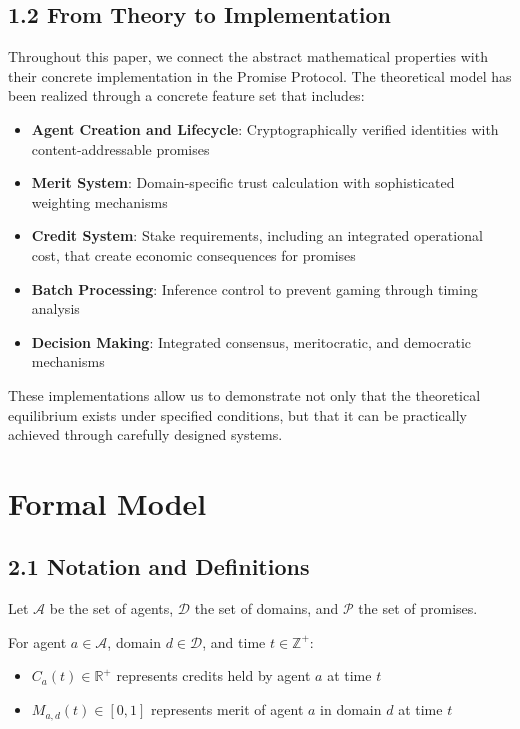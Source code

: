 \documentclass[11pt]{article}
\begin{document}
\subsection{1.2 From Theory to Implementation}
\label{sec:org7b752e5}
Throughout this paper, we connect the abstract mathematical properties with their concrete implementation in the Promise Protocol. The theoretical model has been realized through a concrete feature set that includes:

\begin{itemize}
\item \textbf{Agent Creation and Lifecycle}: Cryptographically verified identities with content-addressable promises
\item \textbf{Merit System}: Domain-specific trust calculation with sophisticated weighting mechanisms
\item \textbf{Credit System}: Stake requirements, including an integrated operational cost, that create economic consequences for promises
\item \textbf{Batch Processing}: Inference control to prevent gaming through timing analysis
\item \textbf{Decision Making}: Integrated consensus, meritocratic, and democratic mechanisms
\end{itemize}

These implementations allow us to demonstrate not only that the theoretical equilibrium exists under specified conditions, but that it can be practically achieved through carefully designed systems.
\section{Formal Model}
\label{sec:org2dfcb47}
\subsection{2.1 Notation and Definitions}
\label{sec:orgbdda3de}
Let \(\mathcal{A}\) be the set of agents, \(\mathcal{D}\) the set of domains, and \(\mathcal{P}\) the set of promises.

For agent \(a \in \mathcal{A}\), domain \(d \in \mathcal{D}\), and time \(t \in \mathbb{Z}^+\):
\begin{itemize}
\item \(C_a(t) \in \mathbb{R}^+\) represents credits held by agent \(a\) at time \(t\)
\item \(M_{a,d}(t) \in [0,1]\) represents merit of agent \(a\) in domain \(d\) at time \(t\)
\end{itemize}
\end{document}
